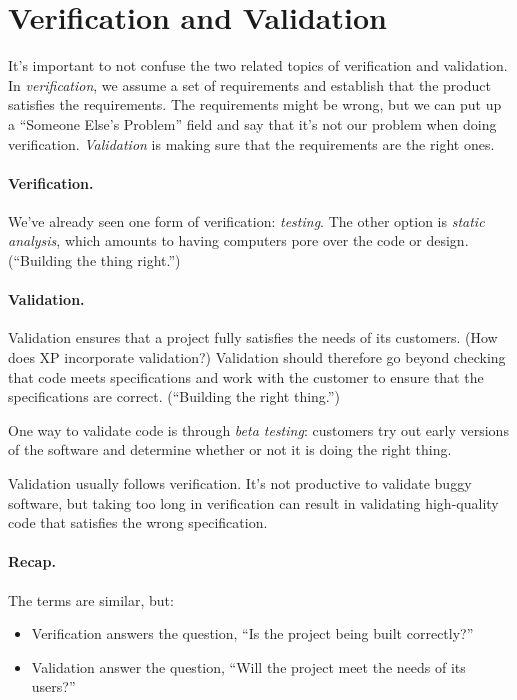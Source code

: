 




\section*{Verification and Validation}
It's important to not confuse the two related topics of verification
and validation. In \emph{verification}, we assume a set of
requirements and establish that the product satisfies the
requirements. The requirements might be wrong, but we can put up a
``Someone Else's Problem'' field and say that it's not our problem
when doing verification. \emph{Validation} is making sure that the
requirements are the right ones.

\paragraph{Verification.} We've already seen one form of verification:
\emph{testing}. The other option is \emph{static analysis}, which amounts
to having computers pore over the code or design. (``Building the thing right.'')

\paragraph{Validation.} Validation ensures that a project fully satisfies 
the needs of its customers. (How does XP incorporate validation?)
Validation should therefore go beyond checking that code meets
specifications and work with the customer to ensure that the
specifications are correct. (``Building the right thing.'')

One way to validate code is through \emph{beta testing}: customers
try out early versions of the software and determine whether or not 
it is doing the right thing.

Validation usually follows verification. It's not productive to
validate buggy software, but taking too long in verification can
result in validating high-quality code that satisfies the wrong
specification.

\paragraph{Recap.} The terms are similar, but:
\begin{itemize}
\item Verification answers the question, ``Is the project being built correctly?''
\item Validation answer the question, ``Will the project meet the needs of its users?''
\end{itemize}

